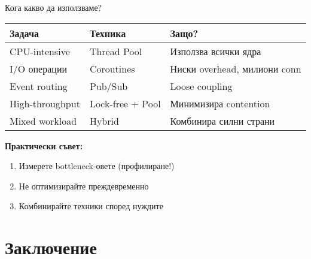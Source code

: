 \documentclass[aspectratio=169]{beamer}
\begin{document}
\begin{frame}{Кога какво да използваме?}
\begin{table}
\centering
\small
\begin{tabular}{|l|l|l|}
\hline
\textbf{Задача} & \textbf{Техника} & \textbf{Защо?} \\
\hline
CPU-intensive & Thread Pool & Използва всички ядра \\
I/O операции & Coroutines & Ниски overhead, милиони conn \\
Event routing & Pub/Sub & Loose coupling \\
High-throughput & Lock-free + Pool & Минимизира contention \\
Mixed workload & Hybrid & Комбинира силни страни \\
\hline
\end{tabular}
\end{table}

\vspace{0.5cm}

\textbf{Практически съвет:}
\begin{enumerate}
    \item Измерете bottleneck-овете (профилиране!)
    \item Не оптимизирайте преждевременно
    \item Комбинирайте техники според нуждите
\end{enumerate}
\end{frame}

\section{Заключение}
\end{document}
